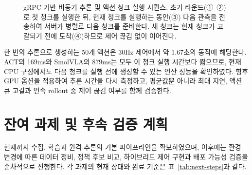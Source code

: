 \documentclass[titlepage]{pnureport}
\begin{document}
\begin{figure}[htbp]
{%
}
\caption{gRPC 기반 비동기 추론 및 액션 청크 실행 시퀀스. 초기 라운드(①~②)로 첫 청크를 실행한 뒤, 현재 청크를 실행하는 동안(③) 다음 관측을 전송하여 서버가 병렬로 다음 청크를 준비한다. 새 청크는 현재 청크가 고갈되기 전에 도착(④)하므로 제어 끊김 없이 이어진다.}
\label{fig:async-inference-sequence}
\end{figure}

한 번의 추론으로 생성하는 50개 액션은 30Hz 제어에서 약 1.67초의 동작에 해당한다. ACT의 169ms와 SmolVLA의 879ms는 모두 이 청크 실행 시간보다 짧으므로, 현재 CPU 구성에서도 다음 청크를 실행 전에 생성할 수 있는 연산 성능을 확인하였다. 향후 GPU 옵션을 적용하여 추론 시간을 다시 측정하고, 평균값뿐 아니라 최대 지연, 액션 큐 고갈과 연속 rollout 중 제어 끊김 여부를 함께 검증한다.

\section{잔여 과제 및 후속 검증 계획}

현재까지 수집, 학습과 원격 추론의 기본 파이프라인을 확보하였으며, 이후에는 환경 변경에 따른 데이터 정비, 정책 후보 비교, 하이브리드 제어 구현과 배포 가능성 검증을 순차적으로 진행한다. 각 과제의 현재 상태와 완료 기준은 표~\ref{tab:next-steps}과 같다.
\end{document}
